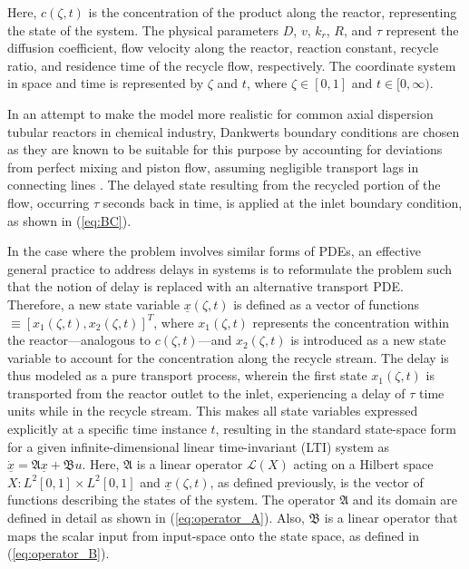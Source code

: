 Here, $c(\zeta, t)$ is the concentration of the product along the reactor, representing the state of the system. The physical parameters $D$, $v$, $k_r$, $R$, and $\tau$ represent the diffusion coefficient, flow velocity along the reactor, reaction constant, recycle ratio, and residence time of the recycle flow, respectively. The coordinate system in space and time is represented by $\zeta$ and $t$, where $\zeta \in [0, 1]$ and $t \in [0, \infty)$.

In an attempt to make the model more realistic for common axial dispersion tubular reactors in chemical industry, Dankwerts boundary conditions are chosen as they are known to be suitable for this purpose by accounting for deviations from perfect mixing and piston flow, assuming negligible transport lags in connecting lines \cite{danckwerts1993continuous}. The delayed state resulting from the recycled portion of the flow, occurring $\tau$ seconds back in time, is applied at the inlet boundary condition, as shown in (\ref{eq:BC}).

In the case where the problem involves similar forms of PDEs, an effective general practice to address delays in systems is to reformulate the problem such that the notion of delay is replaced with an alternative transport PDE. Therefore, a new state variable $\underline{x}(\zeta, t)$ is defined as a vector of functions $\equiv [x_1(\zeta, t), x_2(\zeta, t)]^T$, where $x_1(\zeta, t)$ represents the concentration within the reactor—analogous to $c(\zeta,t)$—and $x_2(\zeta, t)$ is introduced as a new state variable to account for the concentration along the recycle stream. The delay is thus modeled as a pure transport process, wherein the first state $x_1(\zeta, t)$ is transported from the reactor outlet to the inlet, experiencing a delay of $\tau$ time units while in the recycle stream. This makes all state variables expressed explicitly at a specific time instance $t$, resulting in the standard state-space form for a given infinite-dimensional linear time-invariant (LTI) system as $\dot{\underline{x}} = \mathfrak{A} \underline{x} + \mathfrak{B} u$. Here, $\mathfrak{A}$ is a linear operator $\mathcal{L}(X)$ acting on a Hilbert space $X: L^2[0,1] \times L^2[0,1]$ and $\underline{x}(\zeta,t)$, as defined previously, is the vector of functions describing the states of the system. The operator $\mathfrak{A}$ and its domain are defined in detail as shown in (\ref{eq:operator_A}). Also, $\mathfrak{B}$ is a linear operator that maps the scalar input from input-space onto the state space, as defined in (\ref{eq:operator_B}).

